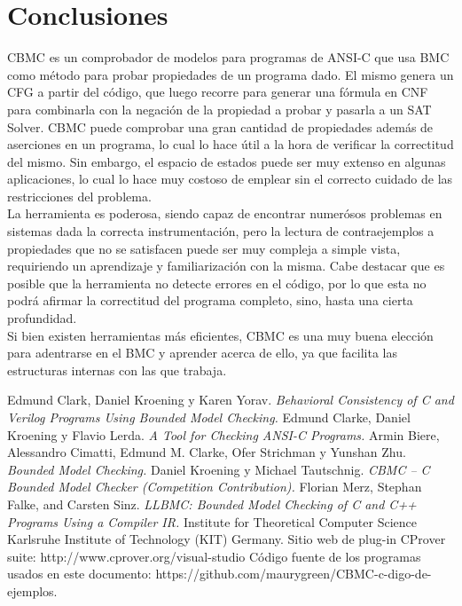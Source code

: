 \documentclass{llncs}
\begin{document}
\section{Conclusiones}
    CBMC es un comprobador de modelos para programas de ANSI-C que usa BMC como
    método para probar propiedades de un programa dado. El mismo genera un CFG
    a partir del código, que luego recorre para generar una fórmula en CNF para
    combinarla con la negación de la propiedad a probar y pasarla a un SAT
    Solver. CBMC puede comprobar una gran cantidad de propiedades además de
    aserciones en un programa, lo cual lo hace útil a la hora de verificar la
    correctitud del mismo. Sin embargo, el espacio de estados puede ser muy
    extenso en algunas aplicaciones, lo cual lo hace muy costoso de emplear sin
    el correcto cuidado de las restricciones del problema.\\
    \indent La herramienta es poderosa, siendo capaz de encontrar numerósos
    problemas en sistemas dada la correcta instrumentación, pero la lectura de
    contraejemplos a propiedades que no se satisfacen puede ser muy compleja a
    simple vista, requiriendo un aprendizaje y familiarización con la misma.
    Cabe destacar que es posible que la herramienta no detecte errores en el
    código, por lo que esta no podrá afirmar la correctitud del
    programa completo, sino, hasta una cierta profundidad.\\
    \indent Si bien existen herramientas más eficientes, CBMC
    es una muy buena elección para adentrarse en el BMC y aprender acerca de
    ello, ya que facilita las estructuras internas con las que trabaja.

\begin{thebibliography}{9}
        Edmund Clark, Daniel Kroening y Karen Yorav. \textit{Behavioral
        Consistency of C and Verilog Programs Using Bounded Model Checking.}
        Edmund Clarke, Daniel Kroening y Flavio Lerda. \textit{A Tool for
        Checking ANSI-C Programs.}
        Armin Biere, Alessandro Cimatti, Edmund M. Clarke, Ofer Strichman y
        Yunshan Zhu. \textit{Bounded Model Checking.}
        Daniel Kroening y Michael Tautschnig. \textit{CBMC – C Bounded Model
        Checker (Competition Contribution).}
        Florian Merz, Stephan Falke, and Carsten Sinz. \textit{LLBMC: Bounded
        Model Checking of C and C++ Programs Using a Compiler IR.} Institute
        for Theoretical Computer Science Karlsruhe Institute of Technology
        (KIT) Germany.
        Sitio web de plug-in CProver suite:
        http://www.cprover.org/visual-studio
        Código fuente de los programas usados en este documento:
        https://github.com/maurygreen/CBMC-c-digo-de-ejemplos.
\end{thebibliography}
\end{document}
